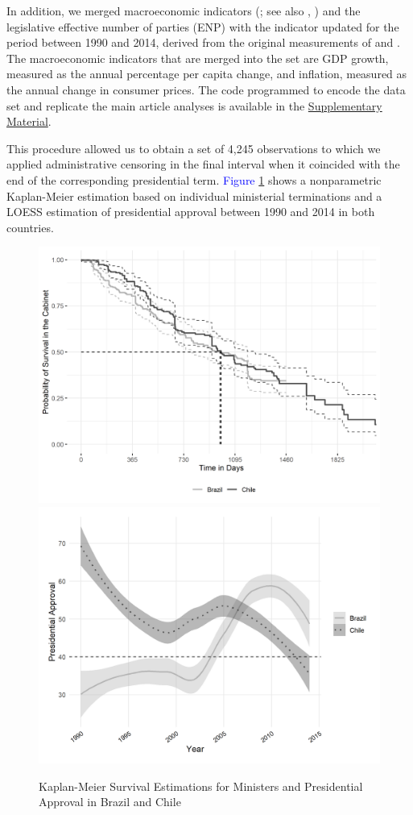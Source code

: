 \documentclass[12pt,halfline,a4paper]{ouparticle}
\begin{document}
In addition, we merged \citeauthor{WorldBank2020} macroeconomic indicators (\citeyear{WorldBank2020}; see also \citeauthor{Piburn2020}, \citeyear{Piburn2020}) and the legislative effective number of parties (ENP) with the \cite{Gallagher2005} indicator updated for the period between 1990 and 2014, derived from the original measurements of \cite{Laakso1979} and \cite{Gallagher1991}. The macroeconomic indicators that are merged into the set are GDP growth, measured as the annual percentage per capita change, and inflation, measured as the annual change in consumer prices. The code programmed to encode the data set and replicate the main article analyses is available in the \href{https://osf.io/asgbj/?view_only=144acd6c8eca4836880b57dee85ea4ff}{Supplementary Material}.

This procedure allowed us to obtain a set of 4,245 observations to which we applied administrative censoring in the final interval when it coincided with the end of the corresponding presidential term. \textcolor{blue}{Figure} \ref{FIG1} shows a nonparametric Kaplan-Meier estimation based on individual ministerial terminations and a LOESS estimation of presidential approval between 1990 and 2014 in both countries.

\begin{figure}[h]
\caption{Kaplan-Meier Survival Estimations for Ministers and Presidential Approval in Brazil and Chile}
\label{FIG1}
\centering \vspace{2mm}
\includegraphics[width=0.49\linewidth]{figures/kaplan_meier} \includegraphics[width=0.49\linewidth]{figures/approval} \\ \vspace{2mm}
\end{figure}
\end{document}
